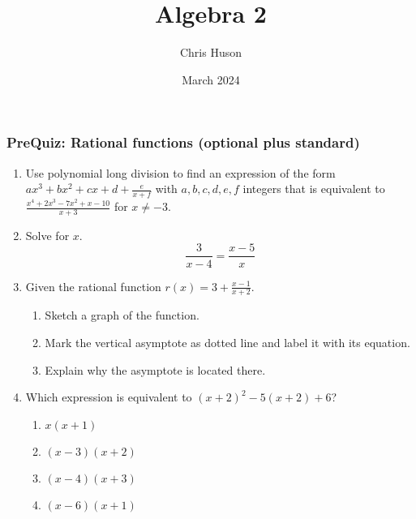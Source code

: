 \documentclass[12pt, twoside]{article}
\title{Algebra 2}
\author{Chris Huson}
\date{March 2024}
\begin{document}
\subsubsection*{PreQuiz: Rational functions (optional plus standard)}
\begin{enumerate}[itemsep=0.5cm]
\item Use polynomial long division to find an expression of the form $ax^3 + bx^2 +cx +d +\frac{e}{x+f}$ with $a,b,c,d, e, f$ integers that is equivalent to $\displaystyle \frac{x^4 + 2x^3 - 7x^2 + x - 10}{x + 3}
$ for $x \neq -3$.
\vspace{10cm}

\item Solve for $x$.
$$\frac{3}{x-4} = \frac{x-5}{x}$$ \vspace{4cm}

\newpage
\item Given the rational function $\displaystyle r(x)= 3 + \frac{x-1}{x+2}$. 
    \begin{enumerate}[itemsep=0.25cm]
        \item Sketch a graph of the function.
        \item Mark the vertical asymptote as dotted line and label it with its equation.
        \item Explain why the asymptote is located there.
    \end{enumerate}
    \begin{center}
    \end{center}

\newpage
\item Which expression is equivalent to $(x + 2)^2 - 5(x + 2) + 6$?
\begin{enumerate}
    \item $x(x + 1)$
    \item $(x - 3)(x + 2)$
    \item $(x - 4)(x + 3)$
    \item $(x - 6)(x + 1)$
\end{enumerate}


\end{enumerate}
\end{document}
